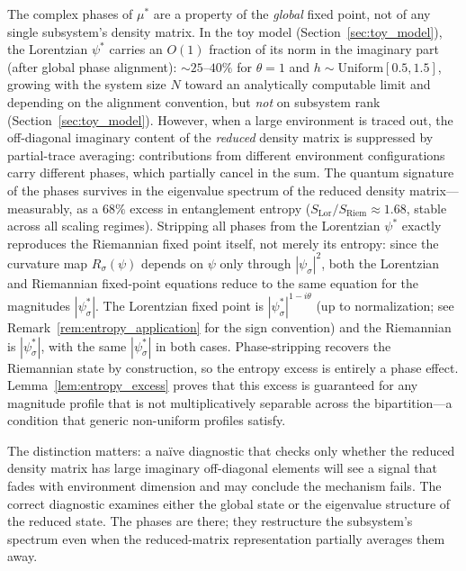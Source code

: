\documentclass[12pt,a4paper]{article}
\theoremstyle{definition}
\theoremstyle{remark}
\begin{document}
The complex phases of $\mu^*$ are a property of the \emph{global}
fixed point, not of any single subsystem's density matrix. In the toy
model (Section~\ref{sec:toy_model}), the Lorentzian $\psi^*$ carries
an $O(1)$ fraction of its norm in the imaginary part (after global
phase alignment): $\sim\!25$--$40\%$ for $\theta = 1$ and
$h \sim \mathrm{Uniform}[0.5, 1.5]$, growing with the system size $N$
toward an analytically computable limit and depending on the alignment
convention, but \emph{not} on subsystem rank
(Section~\ref{sec:toy_model}). However, when a
large environment is traced out, the off-diagonal imaginary content of
the \emph{reduced} density matrix is suppressed by partial-trace
averaging: contributions from different environment configurations
carry different phases, which partially cancel in the sum. The quantum
signature of the phases survives in the eigenvalue spectrum of the
reduced density matrix---measurably, as a $68\%$ excess in entanglement
entropy ($S_{\mathrm{Lor}} / S_{\mathrm{Riem}} \approx 1.68$, stable
across all scaling regimes). Stripping all phases from the Lorentzian
$\psi^*$ exactly reproduces the Riemannian fixed point itself, not
merely its entropy: since the curvature map $R_\sigma(\psi)$ depends
on $\psi$ only through $|\psi_\sigma|^2$, both the Lorentzian and
Riemannian fixed-point equations reduce to the same equation for the
magnitudes $|\psi^*_\sigma|$. The Lorentzian fixed point is
$|\psi^*_\sigma|^{1-i\theta}$ (up to normalization; see
Remark~\ref{rem:entropy_application} for the sign convention) and the
Riemannian is $|\psi^*_\sigma|$, with the same $|\psi^*_\sigma|$ in
both cases.
Phase-stripping recovers the Riemannian state by construction, so the
entropy excess is entirely a phase effect.
Lemma~\ref{lem:entropy_excess} proves that this excess is guaranteed
for any magnitude profile that is not multiplicatively separable
across the bipartition---a condition that generic non-uniform profiles
satisfy.

The distinction matters: a na\"ive diagnostic that checks only whether
the reduced density matrix has large imaginary off-diagonal elements
will see a signal that fades with environment dimension and may conclude
the mechanism fails. The correct diagnostic examines either the global
state or the eigenvalue structure of the reduced state. The phases are
there; they restructure the subsystem's spectrum even when the
reduced-matrix representation partially averages them away.

\end{document}
